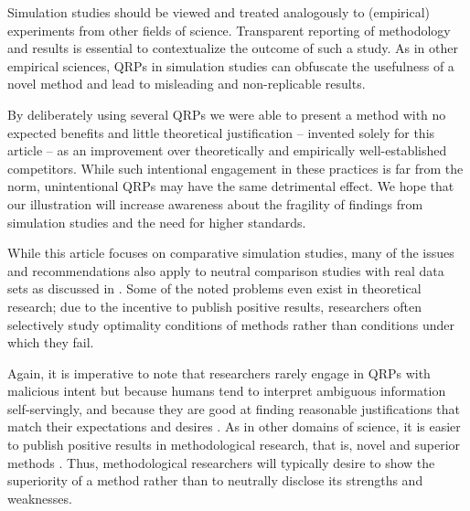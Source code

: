 \documentclass[a4paper, 11pt]{article}
\begin{document}
Simulation studies should be viewed and treated analogously to (empirical)
experiments from other fields of science. Transparent reporting of methodology
and results is essential to contextualize the outcome of such a study. As in
other empirical sciences, QRPs in simulation studies can obfuscate the
usefulness of a novel method and lead to misleading and non-replicable results.

By deliberately using several QRPs we were able to present a method with no
expected benefits and little theoretical justification -- invented solely for
this article -- as an improvement over theoretically and empirically
well-established competitors. While such intentional engagement in these
practices is far from the norm, unintentional QRPs may have the same detrimental
effect. We hope that our illustration will increase awareness about the
fragility of findings from simulation studies and the need for higher standards.

While this article focuses on comparative simulation studies, many of the issues
and recommendations also apply to neutral comparison studies with real data sets
as discussed in \citet{Niessl2021}. Some of the noted problems even exist in
theoretical research; due to the incentive to publish positive results,
researchers often selectively study optimality conditions of methods rather than
conditions under which they fail.

Again, it is imperative to note that researchers rarely engage in QRPs with
malicious intent but because humans tend to interpret ambiguous information
self-servingly, and because they are good at finding reasonable justifications
that match their expectations and desires \citep{Simmons2011}. As in other
domains of science, it is easier to publish positive results in methodological
research, that is, novel and superior methods \citep{Boulesteix2015}. Thus,
methodological researchers will typically desire to show the superiority of a
method rather than to neutrally disclose its strengths and weaknesses.
\end{document}
